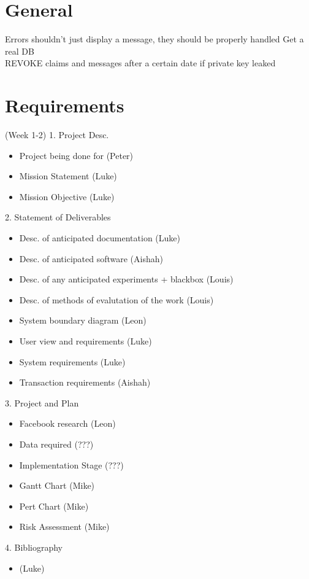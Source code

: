 \section{General}
Errors shouldn't just display a message, they should be properly handled
Get a real DB\\
REVOKE claims and messages after a certain date if private key leaked\\

\section{Requirements} (Week 1-2)
1. Project Desc.
\begin{itemize}
\item Project being done for (Peter)
\item Mission Statement (Luke)
\item Mission Objective (Luke)
\end{itemize}

2. Statement of Deliverables
\begin{itemize}
\item Desc. of anticipated documentation (Luke)
\item Desc. of anticipated software (Aishah)
\item Desc. of any anticipated experiments + blackbox (Louis)
\item Desc. of methods of evalutation of the work (Louis)
\item System boundary diagram (Leon)
\item User view and requirements (Luke)
\item System requirements (Luke)
\item Transaction requirements (Aishah)
\end{itemize}

3. Project and Plan
\begin{itemize}
\item Facebook research (Leon)
\item Data required (???)
\item Implementation Stage (???)
\item Gantt Chart (Mike)
\item Pert Chart (Mike)
\item Risk Assessment (Mike)
\end{itemize}

4. Bibliography
\begin{itemize}
\item (Luke)
\end{itemize}

